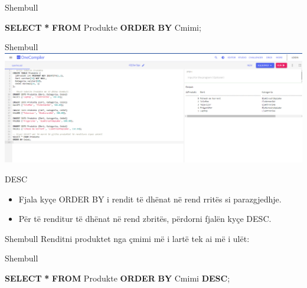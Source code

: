 \documentclass[
  ignorenonframetext,
]{beamer}
\newenvironment{Shaded}{\begin{snugshade}}{\end{snugshade}}
\newcommand{\KeywordTok}[1]{\textcolor[rgb]{0.13,0.29,0.53}{\textbf{#1}}}
\newcommand{\NormalTok}[1]{#1}
\newcommand{\OperatorTok}[1]{\textcolor[rgb]{0.81,0.36,0.00}{\textbf{#1}}}
\begin{document}
\begin{frame}[fragile]{Shembull}
\label{shembull-9}
\begin{Shaded}
\begin{Highlighting}[]
\KeywordTok{SELECT} \OperatorTok{*} \KeywordTok{FROM}\NormalTok{ Produkte}
\KeywordTok{ORDER} \KeywordTok{BY}\NormalTok{ Cmimi;}
\end{Highlighting}
\end{Shaded}
\end{frame}

\begin{frame}{Shembull}
\label{shembull-10}
\includegraphics{./Figs/query9.png}
\end{frame}

\begin{frame}{DESC}
\label{desc}
\begin{itemize}
\item
  Fjala kyçe ORDER BY i rendit të dhënat në rend rritës si parazgjedhje.
\item
  Për të renditur të dhënat në rend zbritës, përdorni fjalën kyçe DESC.
\end{itemize}
\end{frame}

\begin{frame}{Shembull}
\label{shembull-11}
Renditni produktet nga çmimi më i lartë tek ai më i ulët:
\end{frame}

\begin{frame}[fragile]{Shembull}
\label{shembull-12}
\begin{Shaded}
\begin{Highlighting}[]
\KeywordTok{SELECT} \OperatorTok{*} \KeywordTok{FROM}\NormalTok{ Produkte}
\KeywordTok{ORDER} \KeywordTok{BY}\NormalTok{ Cmimi }\KeywordTok{DESC}\NormalTok{;}
\end{Highlighting}
\end{Shaded}
\end{frame}
\end{document}
